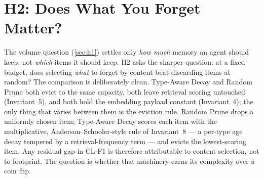 

\section{H2: Does What You Forget Matter?}
\label{sec:h2}

The volume question (\autoref{sec:h1}) settles only \emph{how much} memory an agent
should keep, not \emph{which} items it should keep. H2 asks the sharper question: at a
fixed budget, does selecting \emph{what} to forget by content beat discarding items at
random? The comparison is deliberately clean. Type-Aware Decay and Random Prune both
evict to the same capacity, both leave retrieval scoring untouched (Invariant~5), and both
hold the embedding payload constant (Invariant~4); the only thing that varies between them
is the eviction rule. Random Prune drops a uniformly chosen item; Type-Aware Decay scores
each item with the multiplicative, Anderson--Schooler-style rule of Invariant~8
\citep{anderson1991} --- a per-type age decay tempered by a retrieval-frequency term ---
and evicts the lowest-scoring item. Any residual gap in CL-F1 is therefore attributable to
content selection, not to footprint. The question is whether that machinery earns its
complexity over a coin flip.

